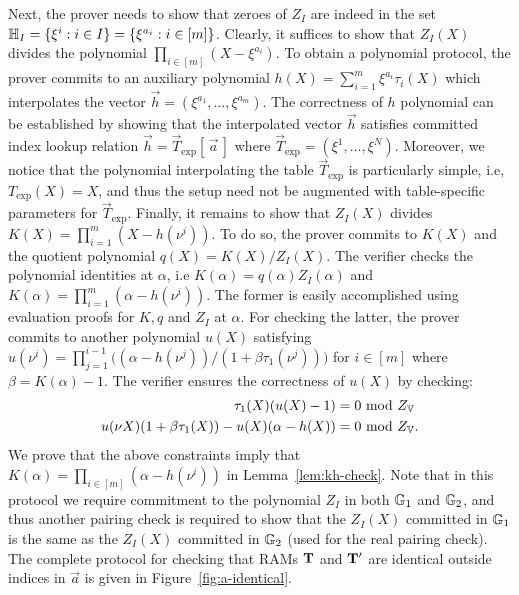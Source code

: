 Next, the prover needs to show that zeroes of $Z_I$ are indeed in the set $\mathbb{H}_I=\{\xi^i: i\in I\}=\{\xi^{a_i}:i\in [m]\}$.
Clearly, it suffices to show that $Z_I(X)$ divides the polynomial $\prod_{i\in [m]}(X - \xi^{a_i})$. To obtain a
polynomial protocol, the prover commits to an auxiliary polynomial $h(X)=\sum_{i=1}^m \xi^{a_i}\tau_i(X)$
which interpolates the vector $\vec{h}=(\xi^{a_1},\ldots,\xi^{a_m})$. The correctness of $h$ polynomial can be
established by showing that the interpolated vector $\vec{h}$ satisfies committed index lookup relation
$\vec{h}=\vec{T}_{\exp}[\,\vec{a}\,]$ where $\vec{T}_{\exp}=(\xi^1,\ldots,\xi^N)$. Moreover, we notice that the polynomial
interpolating the table $\vec{T}_{\exp}$ is particularly simple, i.e, $T_{\exp}(X)=X$, and thus the setup need not be
augmented with table-specific parameters for $\vec{T}_{\exp}$.
Finally, it remains to show that $Z_I(X)$ divides $K(X) = \prod_{i=1}^m (X - h(\nu^i))$. To do so, the prover commits to
$K(X)$ and the quotient polynomial $q(X)=K(X)/Z_I(X)$. The verifier checks the polynomial identities
at $\alpha$, i.e $K(\alpha)=q(\alpha)Z_I(\alpha)$ and $K(\alpha)=\prod_{i=1}^m(\alpha - h(\nu^i))$.
The former is easily accomplished
using evaluation proofs for $K,q$ and $Z_I$ at $\alpha$.
For checking the latter, the prover commits to another polynomial
$u(X)$ satisfying $u(\nu^i)=\prod_{j=1}^{i-1}\big((\alpha - h(\nu^j))/(1 + \beta\tau_1(\nu^j))\big)$ for $i\in [m]$
where $\beta=K(\alpha) - 1$.
The verifier ensures the correctness of $u(X)$ by checking:
\begin{equation}
    \begin{aligned}
        \tau_1(X)(u(X) - 1) &= 0 \text{ mod } Z_{\setV} \\
        u(\nu X)(1+\beta \tau_1(X))-u(X)(\alpha - h(X)) &= 0 \text{ mod } Z_\setV.
    \end{aligned}
    \label{eq:kh-check}
\end{equation}
We prove that the above constraints imply that $K(\alpha)=\prod_{i\in [m]}(\alpha - h(\nu^i))$ in Lemma~\ref{lem:kh-check}.
Note that in this protocol we require commitment to the polynomial $Z_I$ in both $\mathbb{G}_1$ and $\mathbb{G}_2$,
and thus another pairing check is required to show that the $Z_I(X)$ committed in $\mathbb{G}_1$
is the same as the $Z_I(X)$ committed in $\mathbb{G}_2$ (used for the real pairing check).
The complete protocol for checking that RAMs $\mathbf{T}$ and $\mathbf{T}'$ are identical outside indices in $\vec{a}$
is given in Figure~\ref{fig:a-identical}.

